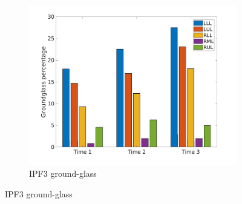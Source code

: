 \begin{figure}[H] 
\centering
\begin{subfigure}{.46\linewidth}%
  \includegraphics[width=\linewidth,trim={{.0\wd0} {.0\wd0} {.0\wd0} {.0\wd0}},clip]{Appendix/Image_AppexA/LobarDistribution/IPF3GroundglassLobarRegionDiseaseDistributionOverTime.jpg} %
  \caption{IPF3 ground-glass}
  \label{fig:IPF3LobarRegionDiseaseDistributionOverTime-a} 
\end{subfigure} 
\hspace{.3in}

\end{figure}

